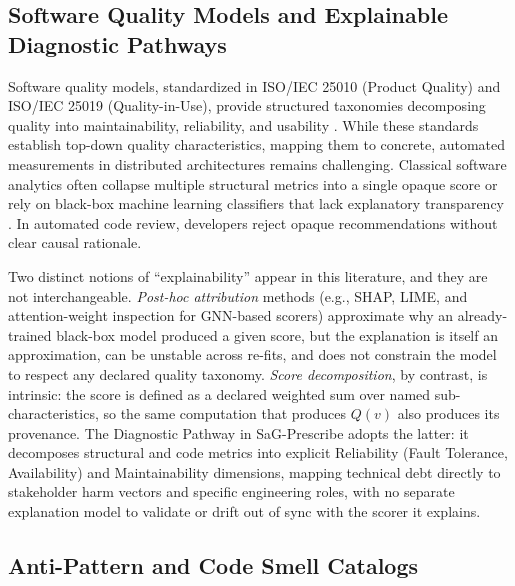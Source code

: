 \subsection{Software Quality Models and Explainable Diagnostic Pathways}
\label{sec:related:quality_models}

Software quality models, standardized in ISO/IEC 25010 (Product Quality) and ISO/IEC 25019 (Quality-in-Use), provide structured taxonomies decomposing quality into maintainability, reliability, and usability \citep{iso25010_2023, iso25019_2023}. While these standards establish top-down quality characteristics, mapping them to concrete, automated measurements in distributed architectures remains challenging. Classical software analytics often collapse multiple structural metrics into a single opaque score or rely on black-box machine learning classifiers that lack explanatory transparency \citep{menzies2018bad}. In automated code review, developers reject opaque recommendations without clear causal rationale.

Two distinct notions of ``explainability'' appear in this literature, and they are not interchangeable. \emph{Post-hoc attribution} methods (e.g., SHAP, LIME, and attention-weight inspection for GNN-based scorers) approximate why an already-trained black-box model produced a given score, but the explanation is itself an approximation, can be unstable across re-fits, and does not constrain the model to respect any declared quality taxonomy. \emph{Score decomposition}, by contrast, is intrinsic: the score is defined as a declared weighted sum over named sub-characteristics, so the same computation that produces $Q(v)$ also produces its provenance. The Diagnostic Pathway in SaG-Prescribe adopts the latter: it decomposes structural and code metrics into explicit Reliability (Fault Tolerance, Availability) and Maintainability dimensions, mapping technical debt directly to stakeholder harm vectors and specific engineering roles, with no separate explanation model to validate or drift out of sync with the scorer it explains.

\subsection{Anti-Pattern and Code Smell Catalogs}
\label{sec:related:catalogs}

